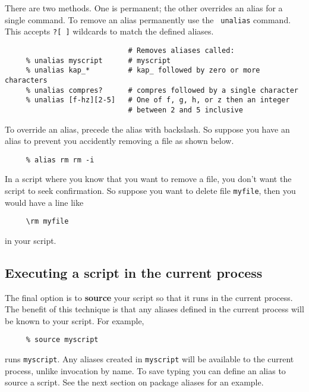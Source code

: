 \documentclass[twoside,11pt]{article}
\newcommand{\htmlref}[2]{#1}
\newcommand{\xlabel}[1]{}
\begin{document}
There are two methods.  One is permanent; the other overrides an alias
for a single command.  To remove an alias permanently use the {\tt
unalias} command.  This accepts {\tt *?[~]} 
\htmlref{\sf wildcards}{sc4_gl_wild} to \htmlref{{\sf match}}{sc4_gl_match} the
defined aliases.

\small
\begin{verbatim}
                             # Removes aliases called:
     % unalias myscript      # myscript
     % unalias kap_*         # kap_ followed by zero or more characters
     % unalias compres?      # compres followed by a single character
     % unalias [f-hz][2-5]   # One of f, g, h, or z then an integer
                             # between 2 and 5 inclusive
\end{verbatim}
\normalsize

To override an alias, precede the alias with backslash.  So suppose you
have an alias to prevent you accidently removing a file as shown below.

\small
\begin{verbatim}
     % alias rm rm -i
\end{verbatim}
\normalsize
In a script where you know that you want to remove a file, you don't
want the script to seek confirmation.  So suppose you want to delete
file {\tt myfile}, then you would have a line like

\small
\begin{verbatim}
     \rm myfile
\end{verbatim}
\normalsize
in your script.


\subsection{\xlabel{sc4_se_source}Executing a script in the current process
\label{sc4_se_source}}

The final option is to {\bf source} your script so that it runs in the
\htmlref{{\sf current process}}{sc4_gl_cur}.  The benefit of this technique is
that any aliases defined in the current process will be known to your
script.  For example,

\small
\begin{verbatim}
     % source myscript
\end{verbatim}
\normalsize
runs {\tt myscript}.  Any aliases created in {\tt myscript} will be
available to the current process, unlike invocation by name.
To save typing you can define an alias to source a script.  See the next
section on package aliases for an example.
\end{document}
